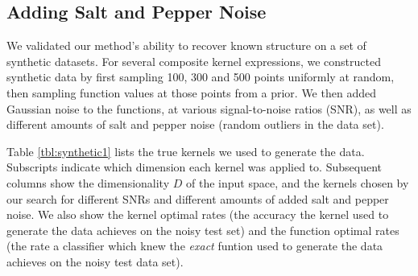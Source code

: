 \documentclass[a4paper,12pt ]{report}
\begin{document}
\subsection{Adding Salt and Pepper Noise}

We validated our method's ability to recover known structure on a set of synthetic datasets.
For several composite kernel expressions, we constructed synthetic data by first sampling 100, 300 and 500 points uniformly at random, then sampling function values at those points from a \gp{} prior.
We then added \iid Gaussian noise to the functions, at various signal-to-noise ratios (SNR), as well as different amounts of salt and pepper noise (random outliers in the data set). 

Table \ref{tbl:synthetic1}  lists the true kernels we used to generate the data.  Subscripts indicate which dimension each kernel was applied to.  Subsequent columns show the dimensionality $D$ of the input space, and the kernels chosen by our search for different SNRs and different amounts of added salt and pepper noise. 
We also show the kernel optimal rates (the accuracy the kernel used to generate the data achieves on the noisy test set) and the function optimal rates (the rate a classifier which knew the \emph{exact} funtion used to generate the data achieves on the noisy test data set). 
\end{document}
